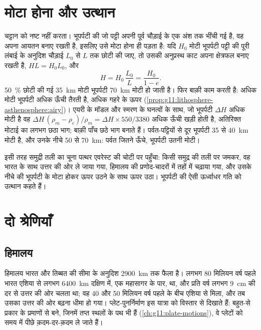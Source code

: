 \section{मोटा होना और उत्थान}

 चट्टान को नष्ट नहीं करता। भूपर्पटी की जो पट्टी अपनी पूर्व चौड़ाई के एक अंश तक
भींची गई है, वह अपना आयतन बनाए रखती है, इसलिए उसे मोटा होना ही पड़ता है: यदि
$H_0$ मोटी भूपर्पटी पट्टी की पूरी लंबाई के अनुदिश चौड़ाई $L_0$ से $L$ तक छोटी की जाए,
तो उसकी अनुप्रस्थ काट अपना क्षेत्रफल बनाए रखती है, $H L = H_0 L_0$, और
\[
  H = H_0\,\frac{L_0}{L} = \frac{H_0}{1 - e}.
\]
\qty{50}{\percent} छोटी की गई \qty{35}{km} मोटी भूपर्पटी
\qty{70}{km} मोटी हो जाती है। फिर  बाक़ी काम करती है: अधिक मोटी भूपर्पटी अधिक
ऊँची तैरती है, अधिक गहरे  के ऊपर (\cref{prop:g11:lithosphere-asthenosphere:airy})।
एयरी के मॉडल और स्मरण के घनत्वों के साथ, जो भूपर्पटी
$\Delta H$ अधिक मोटी है वह $\Delta H\,(\rho_m - \rho_c)/\rho_m = \Delta H
\times 550/3380$ अधिक ऊँची खड़ी होती है, अतिरिक्त मोटाई का लगभग छठा भाग; बाक़ी पाँच
छठे भाग  बनाते हैं। पर्वत-पट्टियों से दूर भूपर्पटी \num{35} से \qty{40}{km} मोटी है,
और उनके नीचे 50 से \qty{70}{km}: पर्वत जितने ऊँचे,
भूपर्पटी उतनी मोटी।

इसी तरह समुद्री तली का चूना पत्थर एवरेस्ट की चोटी पर पहुँचा: किसी समुद्र की
तली पर जमकर, वह भारत के साथ उत्तर की ओर ले जाया गया, हिमालय की प्रणोद-चादरों में
तहों में चढ़ाया गया, और उसके नीचे की भूपर्पटी के मोटा होकर ऊपर उठने के साथ ऊपर उठा।
भूपर्पटी की ऐसी ऊर्ध्वाधर गति को उत्थान कहते हैं।

\section{दो श्रेणियाँ}

\subsection{हिमालय}

हिमालय भारत और
तिब्बत की सीमा के अनुदिश \qty{2900}{km} तक फैला है। लगभग 80 मिलियन वर्ष पहले भारत
एशिया से लगभग \qty{6400}{km} दक्षिण में, एक महासागर के पार, था, और प्रति वर्ष लगभग
\qty{9}{cm} की दर से उत्तर की ओर चलता था; वह 40 और 50 मिलियन वर्ष पहले के बीच
एशिया से मिला, और तब उसका उत्तर की ओर बढ़ना
धीमा हो गया। प्लेट-पुनर्निर्माण इस यात्रा को विस्तार से दिखाते हैं: बहुत-से
प्रकार के प्रमाणों से बने, जिनमें तप्त स्थलों के पथ भी हैं
(\cref{ch:g11:plate-motions}), वे प्लेटों को समय में पीछे क़दम-दर-क़दम
ले जाते हैं।

